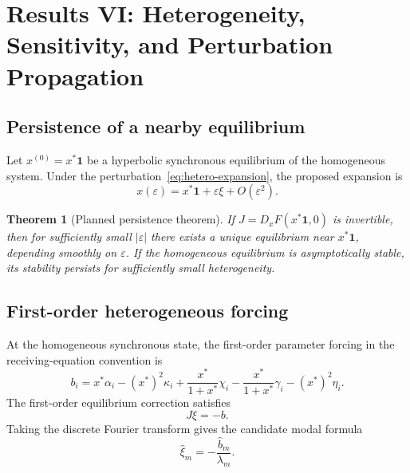 \documentclass[11pt, reqno]{amsart}
\newtheorem{theorem}{Theorem}[section]
\theoremstyle{definition}
\theoremstyle{remark}
\newcommand{\eps}{\varepsilon}
\newcommand{\one}{\mathbf{1}}
\begin{document}
	\section{Results VI: Heterogeneity, Sensitivity, and Perturbation Propagation}
	\label{sec:heterogeneity}
	
	\subsection{Persistence of a nearby equilibrium}
	
	Let $x^{(0)}=x^*\one$ be a hyperbolic synchronous equilibrium of the homogeneous
	system.  Under the perturbation~\eqref{eq:hetero-expansion}, the proposed
	expansion is
	\begin{equation}
		\label{eq:heterogeneous-equilibrium-expansion}
		x(\eps)
		=
		x^*\one+\eps\xi+O(\eps^2).
	\end{equation}
	
	\begin{theorem}[Planned persistence theorem]
		If $J=D_xF(x^*\one,0)$ is invertible, then for sufficiently small $|\eps|$
		there exists a unique equilibrium near $x^*\one$, depending smoothly on
		$\eps$.  If the homogeneous equilibrium is asymptotically stable, its stability
		persists for sufficiently small heterogeneity.
	\end{theorem}
	
	
	\subsection{First-order heterogeneous forcing}
	
	At the homogeneous synchronous state, the first-order parameter forcing in the
	receiving-equation convention is
	\begin{equation}
		\label{eq:heterogeneity-forcing}
		b_i
		=
		x^*\alpha_i
		-(x^*)^2\kappa_i
		+\frac{x^*}{1+x^*}\chi_i
		-\frac{x^*}{1+x^*}\gamma_i
		-(x^*)^2\eta_i.
	\end{equation}
	The first-order equilibrium correction satisfies
	\begin{equation}
		\label{eq:Jxi}
		J\xi=-b.
	\end{equation}
	Taking the discrete Fourier transform gives the candidate modal formula
	\begin{equation}
		\label{eq:xi-Fourier}
		\boxed{
			\widehat\xi_m
			=
			-\frac{\widehat b_m}{\lambda_m}.
		}
	\end{equation}
	
\end{document}
